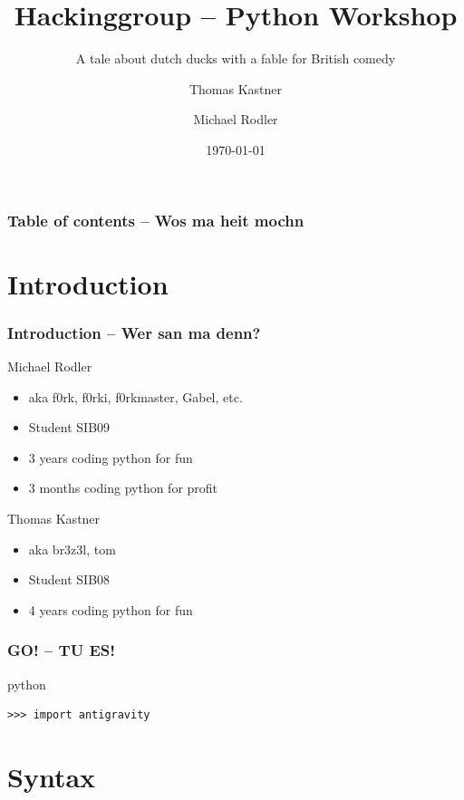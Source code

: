 \documentclass{beamer}
\title[Python Workshop]{Hackinggroup -- Python Workshop}
\subtitle{A tale about dutch ducks with a fable for British comedy}
\author[Thomas Kastner, Michael Rodler]{Thomas Kastner\and Michael Rodler}
\date{\today}
\begin{document}
\begin{frame}
    \titlepage
\end{frame}

\begin{frame}
    \frametitle{Table of contents -- Wos ma heit mochn}
    \tableofcontents
\end{frame}

\section{Introduction}

\begin{frame}
    \frametitle{Introduction -- Wer san ma denn?}

    \begin{block}{Michael Rodler}
    \begin{itemize}
        \item aka f0rk, f0rki, f0rkmaster, Gabel, etc.
        \item Student SIB09
        \item 3 years coding python for fun
        \item 3 months coding python for profit
    \end{itemize}
    \end{block}

    \begin{block}{Thomas Kastner}
    \begin{itemize}
        \item aka br3z3l, tom
        \item Student SIB08
        \item 4 years coding python for fun
    \end{itemize}
    \end{block}
\end{frame}


\begin{frame}[fragile]
	\frametitle{GO! -- TU ES!}
	\pause
    \begin{exampleblock}{python}
    \begin{lstlisting}
>>> import antigravity
    \end{lstlisting}
    \end{exampleblock}
\end{frame}


\section{Syntax}
\end{document}
